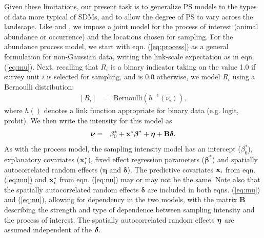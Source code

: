 \documentclass[times,mee,doublespace,]{besauth2}
\begin{document}
Given these limitations, our present task is to generalize PS models to the types of data more typical of SDMs, and to allow the degree of PS to vary across the landscape.  Like \citet{DiggleEtAl2010} and \citet{PatiEtAl2011}, we impose a joint model for the process of interest (animal abundance or occurrence) and the locations chosen for sampling. For the abundance process model, we start with eqn. (\ref{eq:process}) as a general formulation for non-Gaussian data, writing the link-scale expectation as in eqn. (\ref{eq:mu}).
Next, recalling that $R_i$ is a binary indicator taking on the value 1.0 if survey unit $i$ is selected for sampling, and is 0.0 otherwise, we model $R_i$ using a Bernoulli distribution:
\begin{eqnarray}
 \label{eq:R}
  [R_i] & = & \text{Bernoulli}(h^{-1}(\nu_i)),
\end{eqnarray}
where $h()$ denotes a link function appropriate for binary data (e.g. logit, probit).  We then write the intensity for this model as
\begin{eqnarray}
  \label{eq:nu}
  \boldsymbol{\nu} & = & \beta_0^* + {\bf x}^* \boldsymbol{\beta}^*+\boldsymbol{\eta}+{\bf B} \boldsymbol{\delta}.
\label{eq:nu}
\end{eqnarray}
  As with the process model, the sampling intensity model has an intercept ($\beta_0^*$), explanatory covariates (${\bf x}_i^*$), fixed effect regression parameters ($\boldsymbol{\beta}^*$) and spatially autocorrelated random effects ($\boldsymbol{\eta}$ and $\boldsymbol{\delta}$).  The predictive covariates ${\bf x}_i$ from eqn. (\ref{eq:mu}) and ${\bf x}_i^*$ from eqn. (\ref{eq:nu}) may or may not be the same.  Note also that the  spatially autocorrelated random effects $\boldsymbol{\delta}$ are included in both eqns. (\ref{eq:mu}) and (\ref{eq:nu}), allowing for dependency in the two models, with the matrix {\bf B} describing the strength and type of dependence between sampling intensity and the process of interest.  The spatially autocorrelated random effects $\boldsymbol{\eta}$ are assumed independent of the $\boldsymbol{\delta}$.
\end{document}
